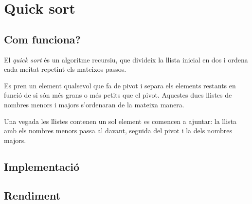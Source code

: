 \chapter{Quick sort}

\section{Com funciona?}
El \textit{quick sort} és un algoritme recursiu, que divideix la llista inicial en dos i ordena cada meitat repetint els mateixos passos.

Es pren un element qualsevol que fa de pivot i separa els elements restants en funció de si són més grans o més petits que el pivot. Aquestes dues llistes de nombres menors i majors s'ordenaran de la mateixa manera.

Una vegada les llistes contenen un sol element es comencen a ajuntar: la llista amb els nombres menors passa al davant, seguida del pivot i la dels nombres majors.
\section{Implementació}

\vspace{1em}

\begin{minipage}{\textwidth}
	\section{Rendiment}
	\noindent
	\makebox[\textwidth][c]{
		
		}
	\vspace*{1em}
	\begin{center}
		\resizebox{\textwidth}{!}{}
	\end{center}
\end{minipage}